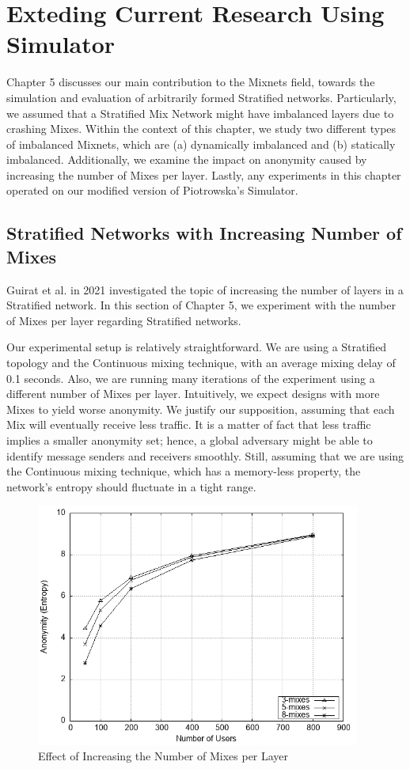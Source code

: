 \documentclass[logo,msc,cyber]{infthesis}   %
\begin{document}
\chapter{Exteding Current Research Using Simulator}
Chapter 5 discusses our main contribution to the Mixnets field, towards the
simulation and evaluation of arbitrarily formed Stratified networks.
Particularly, we assumed that a Stratified Mix Network might have imbalanced
layers due to crashing Mixes. Within the context of this chapter, we study two
different types of imbalanced Mixnets, which are (a) dynamically imbalanced and
(b) statically imbalanced. Additionally, we examine the impact on anonymity
caused by increasing the number of Mixes per layer. Lastly, any experiments in
this chapter operated on our modified version of Piotrowska's
Simulator\cite{simulator}.

\section{Stratified Networks with Increasing Number of Mixes}

Guirat et al.\cite{ben2021mixim} in 2021 investigated the topic of increasing the
number of layers in a Stratified network. In this section of Chapter 5, we
experiment with the number of Mixes per layer regarding Stratified networks.

Our experimental setup is relatively straightforward. We are using a Stratified
topology and the Continuous mixing technique, with an average mixing delay of 0.1
seconds. Also, we are running many iterations of the experiment using a
different number of Mixes per layer. Intuitively, we expect designs with more
Mixes to yield worse anonymity. We justify our supposition, assuming that each
Mix will eventually receive less traffic. It is a matter of fact that less
traffic implies a smaller anonymity set; hence, a global adversary might be able
to identify message senders and receivers smoothly. Still, assuming that we are
using the Continuous mixing technique, which has a memory-less property, the
network's entropy should fluctuate in a tight range.

\begin{figure}[h!]
    \centering
    \includegraphics[height=8cm]{figures/simulator_extentions/compare_layer_size.png}
    \caption{Effect of Increasing the Number of Mixes per Layer}
    \label{fig:stratified-incresing-number-of-mixes}
\end{figure}    
\end{document}
